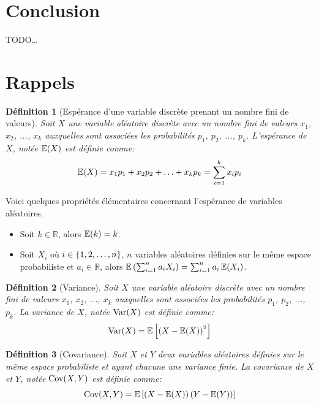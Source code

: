 \documentclass[10pt]{article}
\newtheorem{definition}{Définition}
\begin{document}
\hypertarget{conclusion}{%
\section{\texorpdfstring{Conclusion
\label{conclusion}}{Conclusion }}\label{conclusion}}

TODO\ldots{}

\appendix

\hypertarget{rappels}{%
\section{\texorpdfstring{Rappels
\label{rappel_esperance}}{Rappels }}\label{rappels}}

\begin{definition}[Espérance d'une variable discrète prenant un nombre fini de valeurs]
Soit $X$ une variable aléatoire discrète avec un nombre fini de valeurs $x_1$, $x_2$, ..., $x_k$ auxquelles sont associées les probabilités $p_1$, $p_2$, ..., $p_k$. L'espérance de $X$, notée $\operatorname{\mathbb{E}} (X)$ est définie comme:
$$ \operatorname{\mathbb{E}} (X) = x_1p_1+x_2p_2+\ldots +x_kp_k = \sum_{i=1}^k x_i p_i $$
\end{definition}

Voici quelques propriétés élémentaires concernant l'espérance de
variables aléatoires.

\begin{itemize}
\item
  Soit \(k\in\mathbb{R}\), alors \(\operatorname{\mathbb{E}}(k)=k\).
\item
  Soit \(X_i\) où \(i\in\left\{1,2,\ldots,n\right\}\), \(n\) variables aléatoires
  définies sur le même espace probabiliste et \(a_i\in\mathbb{R}\),
  alors \(\operatorname{\mathbb{E}}\left(\sum_{i=1}^na_iX_i\right)=\sum_{i=1}^n a_i\operatorname{\mathbb{E}}(X_i)\).
\end{itemize}

\begin{definition}[Variance]
Soit $X$ une variable aléatoire discrète avec un nombre fini de valeurs $x_1$, $x_2$, ..., $x_k$ auxquelles sont associées les probabilités $p_1$, $p_2$, ..., $p_k$. La variance de $X$, notée $\operatorname{Var} (X)$ est définie comme:
$$ \operatorname{Var} (X) = \operatorname{\mathbb{E}}\left[\left(X-\operatorname{\mathbb{E}}(X)\right)^2\right] $$
\end{definition}

\begin{definition}[Covariance]
Soit $X$ et $Y$ deux variables aléatoires définies sur le même espace probabiliste et ayant chacune une variance finie. La covariance de $X$ et $Y$, notée $\operatorname{Cov}(X,Y)$ est définie comme:
$$ \operatorname{Cov}(X,Y)=\operatorname{\mathbb{E}}\left[\left(X-\operatorname{\mathbb{E}}(X)\right)\left(Y-\operatorname{\mathbb{E}}(Y)\right)\right] $$
\end{definition}
\end{document}
